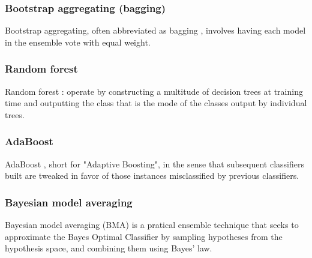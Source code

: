 \subsubsection{Bootstrap aggregating (bagging)}
Bootstrap aggregating, often abbreviated as bagging \cite{breiman1996bagging}, involves having each model in the ensemble vote with equal weight.

\subsubsection{Random forest}

Random forest \cite{breiman2001random}: operate by constructing a multitude of decision trees at training time and outputting the class that is the mode of the classes output by individual trees. 

\subsubsection{AdaBoost}



AdaBoost \cite{freund1997decision}, short for "Adaptive Boosting", in the sense that subsequent classifiers built are tweaked in favor of those instances misclassified by previous classifiers. 


\subsubsection{Bayesian model averaging}

Bayesian model averaging (BMA) \cite{hoeting1999bayesian}  is a pratical ensemble technique that seeks to approximate the Bayes Optimal Classifier by sampling hypotheses from the hypothesis space, and combining them using Bayes' law.